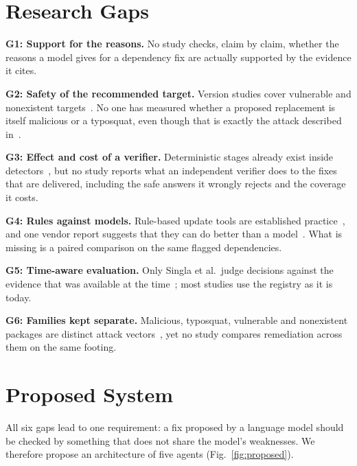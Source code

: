 \documentclass[conference]{IEEEtran}
\begin{document}
\section{Research Gaps}
\label{sec:gaps}
\textbf{G1: Support for the reasons.} No study checks, claim by claim, whether the reasons a model gives for a
dependency fix are actually supported by the evidence it cites.

\textbf{G2: Safety of the recommended target.} Version studies cover vulnerable and nonexistent
targets~\cite{wang2026,singla2026}. No one has measured whether a proposed replacement is itself malicious or a
typosquat, even though that is exactly the attack described in~\cite{spracklen2025,neupane2023}.

\textbf{G3: Effect and cost of a verifier.} Deterministic stages already exist inside
detectors~\cite{sejfia2022,toda2025}, but no study reports what an independent verifier does to the fixes that are
delivered, including the safe answers it wrongly rejects and the coverage it costs.

\textbf{G4: Rules against models.} Rule-based update tools are established practice~\cite{he2023}, and one vendor
report suggests that they can do better than a model~\cite{sonatype2026}. What is missing is a paired comparison on
the same flagged dependencies.

\textbf{G5: Time-aware evaluation.} Only Singla et al.\ judge decisions against the evidence that was available at
the time~\cite{singla2026}; most studies use the registry as it is today.

\textbf{G6: Families kept separate.} Malicious, typosquat, vulnerable and nonexistent packages are distinct attack
vectors~\cite{ladisa2023}, yet no study compares remediation across them on the same footing.

\section{Proposed System}
\label{sec:proposed}
All six gaps lead to one requirement: a fix proposed by a language model should be checked by something that does
not share the model's weaknesses. We therefore propose an architecture of five agents (Fig.~\ref{fig:proposed}).
\end{document}
